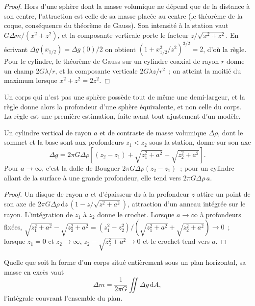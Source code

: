 \begin{proof}
Hors d'une sphère dont la masse volumique ne dépend que de la distance à son
centre, l'attraction est celle de sa masse placée au centre (le
théorème de la coque, conséquence du théorème de Gauss). Son intensité à la
station vaut $G\Delta m/(x^2 + z^2)$, et la composante verticale porte
le facteur $z/\sqrt{x^2 + z^2}$. En écrivant $\Delta g(x_{1/2}) =
\Delta g(0)/2$ on obtient $(1 + x_{1/2}^2/z^2)^{3/2} = 2$, d'où la règle. Pour
le cylindre, le théorème de Gauss sur un cylindre coaxial de rayon $r$ donne
un champ $2G\lambda/r$, et la composante verticale $2G\lambda z/r^2$~;
on atteint la moitié du maximum lorsque $x^2 + z^2 = 2z^2$.
\end{proof}

Un corps qui n'est pas une sphère possède tout de même une demi-largeur, et la règle
donne alors la profondeur d'une sphère équivalente, et non celle du corps. La règle est
une première estimation, faite avant tout ajustement d'un modèle.

\begin{proposition}\label{prop:b3:field-lab-methods-3:vcyl}
Un cylindre vertical de rayon $a$ et de contraste de masse volumique $\Delta\rho$,
dont le sommet et la base sont aux profondeurs $z_1 < z_2$ sous la station,
donne sur son axe
\[
\Delta g = 2\pi G\Delta\rho\left[(z_2 - z_1) + \sqrt{z_1^2 + a^2}
           - \sqrt{z_2^2 + a^2}\right] .
\]
Pour $a \to \infty$, c'est la dalle de Bouguer $2\pi G\Delta\rho(z_2 - z_1)$~;
pour un cylindre allant de la surface à une grande profondeur, elle tend vers
$2\pi G\Delta\rho\,a$.
\end{proposition}

\begin{proof}
Un disque de rayon $a$ et d'épaisseur $\mathrm{d}z$ à la profondeur $z$ attire
un point de son axe de $2\pi G\Delta\rho\,\mathrm{d}z\,(1 -
z/\sqrt{z^2 + a^2})$, attraction d'un anneau intégrée sur le
rayon. L'intégration de $z_1$ à $z_2$ donne le crochet. Lorsque $a \to
\infty$ à profondeurs fixées, $\sqrt{z_1^2 + a^2} - \sqrt{z_2^2 + a^2} =
(z_1^2 - z_2^2)/(\sqrt{z_1^2 + a^2} + \sqrt{z_2^2 + a^2}) \to 0$~; lorsque
$z_1 = 0$ et $z_2 \to \infty$, $z_2 - \sqrt{z_2^2 + a^2} \to 0$ et
le crochet tend vers $a$.
\end{proof}

\begin{proposition}\label{prop:b3:field-lab-methods-3:gauss}
Quelle que soit la forme d'un corps situé entièrement sous un plan horizontal,
sa masse en excès vaut
\[
\Delta m = \frac{1}{2\pi G}\iint \Delta g\,\mathrm{d}A ,
\]
l'intégrale couvrant l'ensemble du plan.
\end{proposition}

